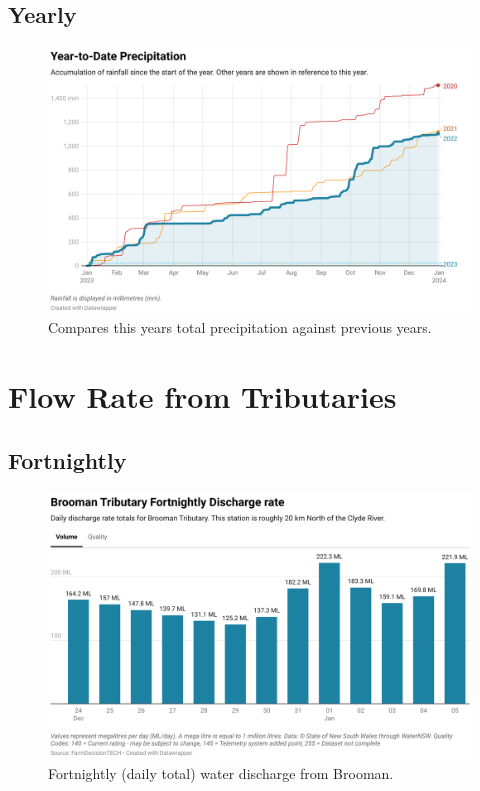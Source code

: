 \documentclass[10pt]{article}
\begin{document}
\subsection{Yearly}
\begin{figure}[H]
\centering
\includegraphics[width=\textwidth]{yearly-precipitation.png}
\caption[Yearly Cumulative Precipitation Budd Island]{Compares this years total precipitation against previous years.}
\end{figure}

\section{Flow Rate from Tributaries}
\subsection{Fortnightly}

\begin{figure}[H]
\centering
\includegraphics[width=\textwidth]{fortnightly-brooman.png}
\caption[Fortnightly Discharge From Brooman Tributary]{Fortnightly (daily total) water discharge from Brooman.}
\end{figure}
\end{document}
